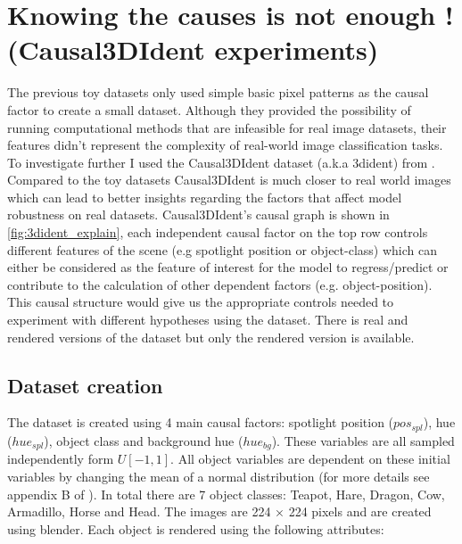 \documentclass[../thesis.tex]{subfiles}
\begin{document}
\section{Knowing the causes is not enough ! (Causal3DIdent experiments)}
\label{sec:3dident}

The previous toy datasets only used simple basic pixel patterns as the causal factor to create a small dataset. Although they provided the possibility of running computational methods that are infeasible for real image datasets, their features didn't represent the complexity of real-world image classification tasks. To investigate further I used the Causal3DIdent dataset (a.k.a 3dident) from \cite{3dident}. Compared to the toy datasets Causal3DIdent is much closer to real world images which can lead to better insights regarding the factors that affect model robustness on real datasets. Causal3DIdent's causal graph is shown in \ref{fig:3dident_explain}, each independent causal factor on the top row controls different features of the scene (e.g spotlight position or object-class) which can either be considered as the feature of interest for the model to regress/predict or contribute to the calculation of other dependent factors (e.g. object-position). This causal structure would give us the appropriate controls needed to experiment with different hypotheses using the dataset. There is real and rendered versions of the dataset but only the rendered version is available.   
 
\subsection{Dataset creation}
The dataset is created using 4 main causal factors: spotlight position ($pos_{spl}$), hue ($hue_{spl}$), object class and background hue ($hue_{bg}$). These variables are all sampled independently form $U[-1,1]$. All object variables are dependent on these initial variables by changing the mean of a normal distribution (for more details see appendix B of \cite{3dident}). In total there are 7 object classes: Teapot, Hare, Dragon, Cow, Armadillo, Horse and Head. The images are 224 × 224 pixels and are created using blender. Each object is rendered using the following attributes:
\end{document}
